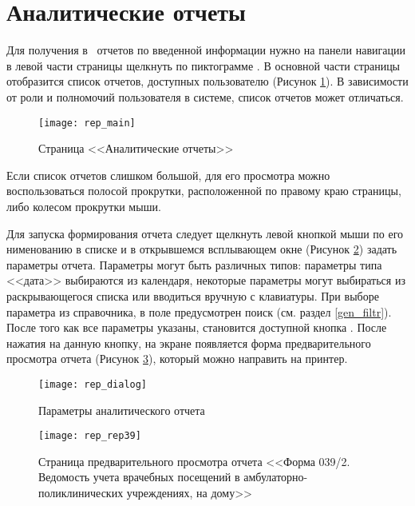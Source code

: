 \newpage
\section{Аналитические отчеты}

Для получения в \tmisp~отчетов по введенной информации нужно на панели навигации в левой части страницы щелкнуть по пиктограмме . В основной части страницы отобразится список отчетов, доступных пользователю (Рисунок \ref{img_rep_main}). В зависимости от роли и полномочий пользователя в системе, список отчетов может отличаться.

\begin{figure}[ht]\centering
	\texttt{[image: rep\_main]}
	\caption{Страница <<Аналитические отчеты>>}
	\label{img_rep_main}
\end{figure}

Если список отчетов слишком большой, для его просмотра можно воспользоваться полосой прокрутки, расположенной по правому краю страницы, либо колесом прокрутки мыши.

Для запуска формирования отчета следует щелкнуть левой кнопкой мыши по его нименованию в списке и в открывшемся всплывающем окне (Рисунок \ref{img_rep_dialog}) задать параметры отчета. Параметры могут быть различных типов: параметры типа <<дата>> выбираются из календаря, некоторые параметры могут выбираться из раскрывающегося списка или вводиться вручную с клавиатуры. При выборе параметра из справочника, в поле предусмотрен поиск (см. раздел \ref{gen_filtr}). После того как все параметры указаны, становится доступной кнопка . После нажатия на данную кнопку, на экране появляется форма предварительного просмотра отчета (Рисунок \ref{img_rep_rep39}), который можно направить на принтер.

\begin{figure}[ht]\centering
	\texttt{[image: rep\_dialog]}
	\caption{Параметры аналитического отчета}
	\label{img_rep_dialog}
\end{figure}

\begin{figure}[!ht]\centering
	\texttt{[image: rep\_rep39]}
	\caption{Страница предварительного просмотра отчета <<Форма 039/2. Ведомость учета врачебных посещений в амбулаторно-поликлинических учреждениях, на дому>>}
	\label{img_rep_rep39}
\end{figure}